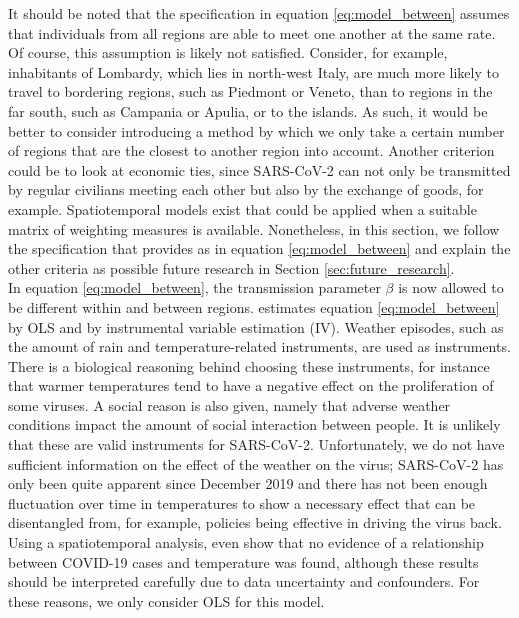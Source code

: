 \documentclass[12pt]{article}
\begin{document}
	It should be noted that the specification in equation \eqref{eq:model_between} assumes that individuals from all regions are able to meet one another at the same rate. Of course, this assumption is likely not satisfied. Consider, for example, inhabitants of Lombardy, which lies in north-west Italy, are much more likely to travel to bordering regions, such as Piedmont or Veneto, than to regions in the far south, such as Campania or Apulia, or to the islands. As such, it would be better to consider introducing a method by which we only take a certain number of regions that are the closest to another region into account. Another criterion could be to look at economic ties, since SARS-CoV-2 can not only be transmitted by regular civilians meeting each other but also by the exchange of goods, for example. Spatiotemporal models exist that could be applied when a suitable matrix of weighting measures is available. Nonetheless, in this section, we follow the specification that \textcite{adda2016economic} provides as in equation \eqref{eq:model_between} and explain the other criteria as possible future research in Section \ref{sec:future_research}. \\
	
	
	In equation \eqref{eq:model_between}, the transmission parameter $\beta$ is now allowed to be different within and between regions. \textcite{adda2016economic} estimates equation \eqref{eq:model_between} by OLS and by instrumental variable estimation (IV). Weather episodes, such as the amount of rain and temperature-related instruments, are used as instruments. There is a biological reasoning behind choosing these instruments, for instance that warmer temperatures tend to have a negative effect on the proliferation of some viruses. A social reason is also given, namely that adverse weather conditions impact the amount of social interaction between people. It is unlikely that these are valid instruments for SARS-CoV-2. Unfortunately, we do not have sufficient information on the effect of the weather on the virus; SARS-CoV-2 has only been quite apparent since December 2019 and there has not been enough fluctuation over time in temperatures to show a necessary effect that can be disentangled from, for example, policies being effective in driving the virus back. Using a spatiotemporal analysis, \textcite{briz2020temperature} even show that no evidence of a relationship between COVID-19 cases and temperature was found, although these results should be interpreted carefully due to data uncertainty and confounders. For these reasons, we only consider OLS for this model. \\
	
\end{document}
